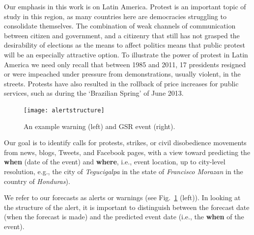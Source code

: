 Our emphasis in this work is on Latin America.
Protest is an important topic of study in this
region, as many countries here are democracies struggling to consolidate themselves.
The combination of weak channels of communication between citizen and government, and a citizenry that still 
has not grasped the desirability of elections as the means to affect politics means that public protest 
will be an especially attractive option. To illustrate the power of protest in Latin America we need 
only recall that between 1985 and 2011, 17 presidents resigned or were impeached under pressure from 
demonstrations, usually violent, in the streets. Protests have also resulted 
in the rollback of price increases for public services, such as during the `Brazilian Spring' of June 2013.
\begin{figure}
    \centering
    \texttt{[image: alertstructure]}
    \caption{An example warning (left) and GSR event (right).}
    \label{fig:alertstructure}
\end{figure}
Our goal is to identify calls for protests, strikes, or civil disobedience movements from news, blogs, Tweets, and Facebook
pages, with a view toward predicting the {\bf when} (date of the event) and {\bf where}, i.e.,
event location, up to city-level resolution, e.g., 
the city of {\it Tegucigalpa} in the state of {\it Francisco Morazan} in the country of {\it Honduras}).

We refer to our forecasts as alerts or warnings (see Fig.~\ref{fig:alertstructure} (left)).
In looking at the structure of the alert, it is important to distinguish between the forecast date (when the forecast is made)
and the predicted event date (i.e., the {\bf when} of the event).


